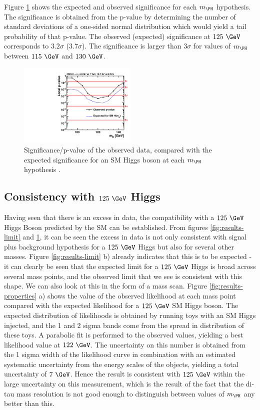 Figure \ref{fig:results-pvalue} shows the expected and observed significance for
each $m_{\PH}$ hypothesis. The significance is obtained from the p-value by
determining the number of standard deviations of a one-sided normal distribution
which would yield a tail probability of that p-value. The observed (expected)
significance at $125~\GeV$ corresponds to $3.2\sigma$ ($3.7\sigma$). The
significance is larger than $3\sigma$ for values of $m_{\PH}$ between $115~\GeV$
and $130~\GeV$.

\begin{figure}[h!]
\includegraphics[width=0.5\textwidth]{plots/htt-sm/cmb_p-value.pdf}
\caption{Significance/p-value of the observed data, compared with the expected
significance for an \ac{SM} Higgs boson at each $m_{\PH}$ hypothesis
\cite{HIG-13-004}.}
\label{fig:results-pvalue}
\end{figure}

\subsection{Consistency with $125~\GeV$ Higgs}
\label{sec:consistency}

Having seen that there is an excess in data, the compatibility with a $125~\GeV$
Higgs Boson predicted by the \ac{SM} can be established. From figures
\ref{fig:results-limit} and \ref{fig:results-pvalue}, it can be seen the excess
in data is not only consistent with signal plus background hypothesis for a
$125~\GeV$ Higgs but also for several other masses. Figure
\ref{fig:results-limit} b) already indicates that this is to be expected - it
can clearly be seen that the expected limit for a $125~\GeV$ Higgs is broad
across several mass points, and the observed limit that we see is consistent
with this shape. We can also look at this in the form of a mass scan. Figure
\ref{fig:results-properties} a) shows the value of the observed likelihood at
each mass point compared with the expected likelihood for a $125~\GeV$ \ac{SM}
Higgs boson. The expected distribution of likelihoods is obtained by running
toys with an \ac{SM} Higgs injected, and the 1 and 2 sigma bands come from the
spread in distribution of these toys. A parabolic fit is performed to the
observed values, yielding a best likelihood value at $122~\GeV$. The uncertainty
on this number is obtained from the 1 sigma width of the likelihood curve in
combination with an estimated systematic uncertainty from the energy scales of
the objects, yielding a total uncertainty of $7~\GeV$. Hence the result is
consistent with $125~\GeV$ within the large uncertainty on this measurement,
which is the result of the fact that the di-tau mass resolution is not good
enough to distinguish between values of $m_{\PH}$ any better than this.

